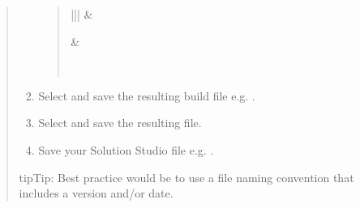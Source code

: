 \documentclass[letterpaper,10pt,english]{sphinxmanual}
\begin{document}
\begin{enumerate}
\begin{quote}
\begin{enumerate}
\begin{quote}
\begin{savenotes}
\begin{tabular}[t]{|*{2}{|}}
&
\\
\hline
{}
&
\\
\hline
\end{tabular}
\par
\sphinxattableend\end{savenotes}
\end{quote}

\item {} 
Select  and save the resulting build file e.g. .

\item {} 
Select  and save the resulting  file.

\item {} 
Save your Solution Studio file e.g. .

\end{enumerate}

\begin{sphinxadmonition}{tip}{Tip:}
Best practice would be to use a file naming convention that includes a version and/or date.
\end{sphinxadmonition}
\end{quote}

\end{enumerate}
\end{document}
